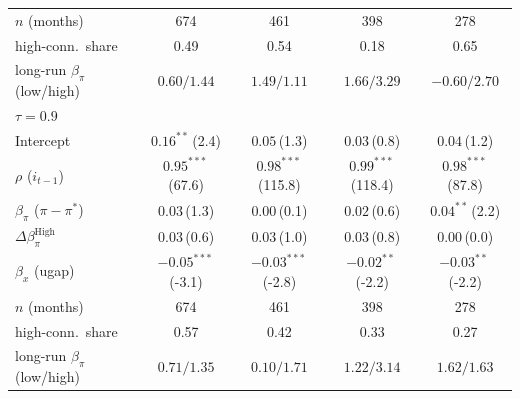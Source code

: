 \begin{tabular}{lcccc}
\addlinespace
$n$ (months) & 674 & 461 & 398 & 278 \\
high-conn.\ share & 0.49 & 0.54 & 0.18 & 0.65 \\
long-run $\beta_\pi$ (low/high) & $0.60/1.44$ & $1.49/1.11$ & $1.66/3.29$ & $-0.60/2.70$ \\
\midrule
\multicolumn{5}{l}{\textit{$\tau=0.9$}} \\
Intercept & $0.16^{**}$\,{\scriptsize(2.4)} & $0.05$\,{\scriptsize(1.3)} & $0.03$\,{\scriptsize(0.8)} & $0.04$\,{\scriptsize(1.2)} \\
$\rho$ ($i_{t-1}$) & $0.95^{***}$\,{\scriptsize(67.6)} & $0.98^{***}$\,{\scriptsize(115.8)} & $0.99^{***}$\,{\scriptsize(118.4)} & $0.98^{***}$\,{\scriptsize(87.8)} \\
$\beta_\pi$ ($\pi-\pi^*$) & $0.03$\,{\scriptsize(1.3)} & $0.00$\,{\scriptsize(0.1)} & $0.02$\,{\scriptsize(0.6)} & $0.04^{**}$\,{\scriptsize(2.2)} \\
$\Delta\beta_\pi^{\text{High}}$ & $0.03$\,{\scriptsize(0.6)} & $0.03$\,{\scriptsize(1.0)} & $0.03$\,{\scriptsize(0.8)} & $0.00$\,{\scriptsize(0.0)} \\
$\beta_x$ (ugap) & $-0.05^{***}$\,{\scriptsize(-3.1)} & $-0.03^{***}$\,{\scriptsize(-2.8)} & $-0.02^{**}$\,{\scriptsize(-2.2)} & $-0.03^{**}$\,{\scriptsize(-2.2)} \\
\addlinespace
$n$ (months) & 674 & 461 & 398 & 278 \\
high-conn.\ share & 0.57 & 0.42 & 0.33 & 0.27 \\
long-run $\beta_\pi$ (low/high) & $0.71/1.35$ & $0.10/1.71$ & $1.22/3.14$ & $1.62/1.63$ \\
\bottomrule
\end{tabular}
